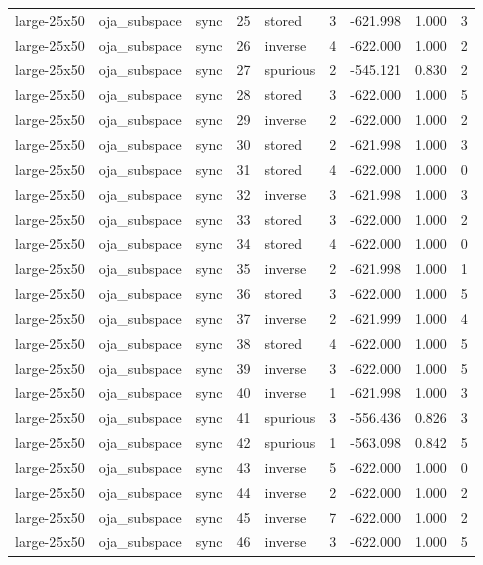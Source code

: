 \begin{tabular}{lllrlrrrr}
large-25x50 & oja\_subspace & sync & 25 & stored & 3 & -621.998 & 1.000 & 3 \\
large-25x50 & oja\_subspace & sync & 26 & inverse & 4 & -622.000 & 1.000 & 2 \\
large-25x50 & oja\_subspace & sync & 27 & spurious & 2 & -545.121 & 0.830 & 2 \\
large-25x50 & oja\_subspace & sync & 28 & stored & 3 & -622.000 & 1.000 & 5 \\
large-25x50 & oja\_subspace & sync & 29 & inverse & 2 & -622.000 & 1.000 & 2 \\
large-25x50 & oja\_subspace & sync & 30 & stored & 2 & -621.998 & 1.000 & 3 \\
large-25x50 & oja\_subspace & sync & 31 & stored & 4 & -622.000 & 1.000 & 0 \\
large-25x50 & oja\_subspace & sync & 32 & inverse & 3 & -621.998 & 1.000 & 3 \\
large-25x50 & oja\_subspace & sync & 33 & stored & 3 & -622.000 & 1.000 & 2 \\
large-25x50 & oja\_subspace & sync & 34 & stored & 4 & -622.000 & 1.000 & 0 \\
large-25x50 & oja\_subspace & sync & 35 & inverse & 2 & -621.998 & 1.000 & 1 \\
large-25x50 & oja\_subspace & sync & 36 & stored & 3 & -622.000 & 1.000 & 5 \\
large-25x50 & oja\_subspace & sync & 37 & inverse & 2 & -621.999 & 1.000 & 4 \\
large-25x50 & oja\_subspace & sync & 38 & stored & 4 & -622.000 & 1.000 & 5 \\
large-25x50 & oja\_subspace & sync & 39 & inverse & 3 & -622.000 & 1.000 & 5 \\
large-25x50 & oja\_subspace & sync & 40 & inverse & 1 & -621.998 & 1.000 & 3 \\
large-25x50 & oja\_subspace & sync & 41 & spurious & 3 & -556.436 & 0.826 & 3 \\
large-25x50 & oja\_subspace & sync & 42 & spurious & 1 & -563.098 & 0.842 & 5 \\
large-25x50 & oja\_subspace & sync & 43 & inverse & 5 & -622.000 & 1.000 & 0 \\
large-25x50 & oja\_subspace & sync & 44 & inverse & 2 & -622.000 & 1.000 & 2 \\
large-25x50 & oja\_subspace & sync & 45 & inverse & 7 & -622.000 & 1.000 & 2 \\
large-25x50 & oja\_subspace & sync & 46 & inverse & 3 & -622.000 & 1.000 & 5 \\

\end{tabular}
